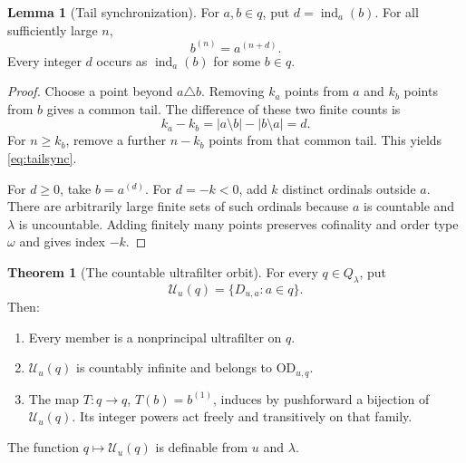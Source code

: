 \documentclass[11pt,letterpaper]{article}
\theoremstyle{definition}
\newtheorem{theorem}[definition]{Theorem}
\newtheorem{lemma}[definition]{Lemma}
\numberwithin{equation}{section}
\newcommand{\OD}{\mathrm{OD}}
\newcommand{\UU}{\mathscr U}
\newcommand{\ind}{\operatorname{ind}}
\begin{document}
\begin{lemma}[Tail synchronization]\label{lem:synchronization}
For $a,b\in q$, put $d=\ind_a(b)$. For all sufficiently large $n$,
\[
 b^{(n)}=a^{(n+d)}.
 \label{eq:tailsync}\tag{11}
\]
Every integer $d$ occurs as $\ind_a(b)$ for some $b\in q$.
\end{lemma}

\begin{proof}
Choose a point beyond $a\triangle b$. Removing $k_a$ points from $a$ and $k_b$ points from $b$ gives a common tail. The difference of these two finite counts is
\[
 k_a-k_b=|a\setminus b|-|b\setminus a|=d.
\]
For $n\ge k_b$, remove a further $n-k_b$ points from that common tail. This yields \eqref{eq:tailsync}.

For $d\ge0$, take $b=a^{(d)}$. For $d=-k<0$, add $k$ distinct ordinals outside $a$. There are arbitrarily large finite sets of such ordinals because $a$ is countable and $\lambda$ is uncountable. Adding finitely many points preserves cofinality and order type $\omega$ and gives index $-k$.
\end{proof}

\begin{theorem}[The countable ultrafilter orbit]\label{thm:ufpositive}
For every $q\in Q_\lambda$, put
\[
 \UU_u(q)=\{D_{u,a}:a\in q\}.
 \label{eq:orbitfamily}\tag{12}
\]
Then:
\begin{enumerate}
\item Every member is a nonprincipal ultrafilter on $q$.
\item $\UU_u(q)$ is countably infinite and belongs to $\OD_{u,q}$.
\item The map $T:q\to q$, $T(b)=b^{(1)}$, induces by pushforward a bijection of $\UU_u(q)$. Its integer powers act freely and transitively on that family.
\end{enumerate}
The function $q\mapsto\UU_u(q)$ is definable from $u$ and $\lambda$.
\end{theorem}
\end{document}
